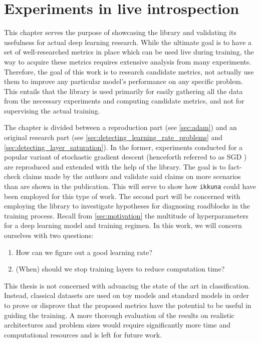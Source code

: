 \chapter{Experiments in live introspection}
\label{ch:experiments}

This chapter serves the purpose of showcasing the library and validating its
usefulness for actual deep learning research. While the ultimate goal is to have
a set of well-researched metrics in place which can be used live during
training, the way to acquire these metrics requires extensive analysis from many
experiments. Therefore, the goal of this work is to research candidate metrics,
not actually use them to improve any particular model's performance on any
specific problem. This entails that the library is used primarily for easily
gathering all the data from the necessary experiments and computing candidate
metrics, and not for supervising the actual training.

The chapter is divided between a reproduction part (see
\cref{sec:adam}) and an original research part (see
\cref{sec:detecting_learning_rate_problems} and
\cref{sec:detecting_layer_saturation}). In the former, experiments conducted
for a popular variant of stochastic gradient descent (henceforth referred to as SGD
) are reproduced and extended with
the help of the library. The goal is to fact-check claims made by the authors
and validate said claims on more scenarios than are shown in the
publication. This will serve to show how \texttt{ikkuna} could have been
employed for this type of work. The second part will be concerned with employing
the library to investigate hypotheses for diagnosing roadblocks in the training
process. Recall from \cref{sec:motivation} the multitude of hyperparameters
for a deep learning model and training regimen. In this work, we will concern
ourselves with two questions:
\begin{enumerate}
    \item How can we figure out a good learning rate?
    \item (When) should we stop training layers to reduce computation time?
\end{enumerate}

This thesis is not concerned with advancing the state of the art in
classification. Instead, classical datasets are used on toy models and standard
models in order to prove or disprove that the proposed metrics have the
potential to be useful in guiding the training. A more thorough evaluation of
the results on realistic architectures and problem sizes would require
significantly more time and computational resources and is left for future work.

